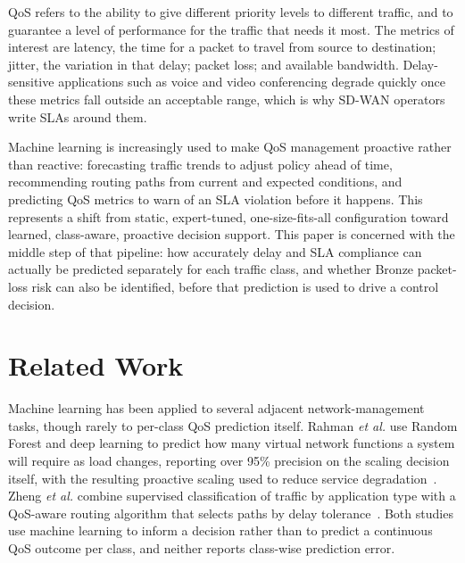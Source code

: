\documentclass[conference]{IEEEtran}
\begin{document}
QoS refers to the ability to give different priority levels to different traffic, and to guarantee a level of performance for the traffic that needs it most. The metrics of interest are latency, the time for a packet to travel from source to destination; jitter, the variation in that delay; packet loss; and available bandwidth. Delay-sensitive applications such as voice and video conferencing degrade quickly once these metrics fall outside an acceptable range, which is why SD-WAN operators write SLAs around them.

Machine learning is increasingly used to make QoS management proactive rather than reactive: forecasting traffic trends to adjust policy ahead of time, recommending routing paths from current and expected conditions, and predicting QoS metrics to warn of an SLA violation before it happens. This represents a shift from static, expert-tuned, one-size-fits-all configuration toward learned, class-aware, proactive decision support. This paper is concerned with the middle step of that pipeline: how accurately delay and SLA compliance can actually be predicted separately for each traffic class, and whether Bronze packet-loss risk can also be identified, before that prediction is used to drive a control decision.

\section{Related Work}

Machine learning has been applied to several adjacent network-management tasks, though rarely to per-class QoS prediction itself. Rahman \emph{et al.} use Random Forest and deep learning to predict how many virtual network functions a system will require as load changes, reporting over 95\% precision on the scaling decision itself, with the resulting proactive scaling used to reduce service degradation~\cite{rahman2019autoscaling}. Zheng \emph{et al.} combine supervised classification of traffic by application type with a QoS-aware routing algorithm that selects paths by delay tolerance~\cite{zheng2022applicationaware}. Both studies use machine learning to inform a decision rather than to predict a continuous QoS outcome per class, and neither reports class-wise prediction error.
\end{document}

